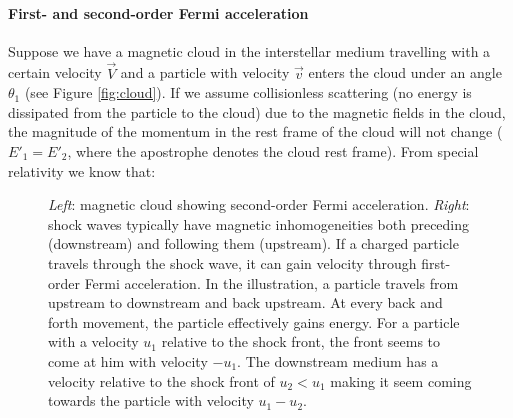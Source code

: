 \paragraph{First- and second-order Fermi acceleration}
\label{para:fermiacceleration}

Suppose we have a magnetic cloud in the interstellar medium travelling with a certain velocity $\vec{V}$ and a particle with velocity $\vec{v}$ enters the cloud under an angle $\theta_1$ (see Figure \ref{fig:cloud}). If we assume collisionless scattering (no energy is dissipated from the particle to the cloud) due to the magnetic fields in the cloud, the magnitude of the momentum in the rest frame of the cloud will not change ($E'_1 = E'_2$, where the apostrophe denotes the cloud rest frame). From special relativity we know that:

\begin{figure}[t]
\begin{minipage}{6in}
  \centering
  \hspace*{.1in}
\end{minipage}
\caption{\textit{Left}: magnetic cloud showing second-order Fermi acceleration. \textit{Right}: shock waves typically have magnetic inhomogeneities both preceding (downstream) and following them (upstream). If a charged particle travels through the shock wave, it can gain velocity through first-order Fermi acceleration. In the illustration, a particle travels from upstream to downstream and back upstream. At every back and forth movement, the particle effectively gains energy. For a particle with a velocity $u_1$ relative to the shock front, the front seems to come at him with velocity $-u_1$. The downstream medium has a velocity relative to the shock front of $u_2 < u_1$ making it seem coming towards the particle with velocity $u_1-u_2$.}

\end{figure}
